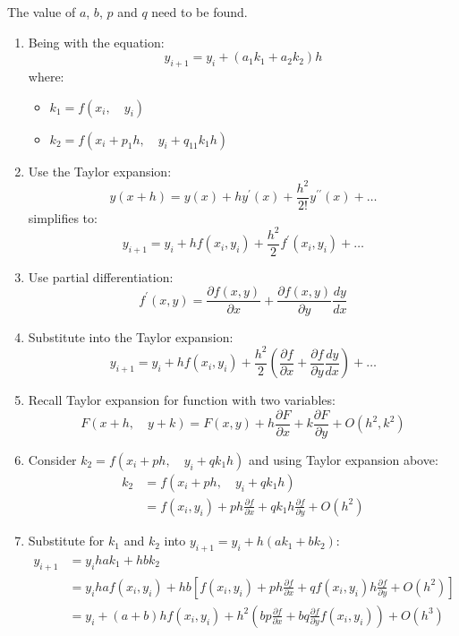 \documentclass[10pt,a4paper]{article}
\begin{document}
The value of $a$, $b$, $p$ and $q$ need to be found.
\begin{enumerate}
    \item Being with the equation: 
    $$
        y_{i+1}=y_i + (a_1k_1+a_2k_2)h
    $$
    where: 
    \begin{itemize}
        \item $k_1 = f(x_i, \quad y_i)$
        \item $k_2 = f(x_i+p_1h, \quad y_i + q_{11}k_1h)$
    \end{itemize}

    \item Use the Taylor expansion:
    $$
        y(x+h)=y(x)+hy^{\prime}(x)+\frac{h^2}{2!}y^{\prime \prime}(x)+\dots
    $$
    simplifies to:
    $$
        y_{i+1}=y_i + hf(x_i,y_i)+\frac{h^2}{2}f^{\prime}(x_i,y_i)+\dots
    $$

    \item Use partial differentiation:
    $$
        f^{\prime}(x,y) = \frac{\partial f(x,y)}{\partial x} + \frac{\partial f(x,y)}{\partial y} \frac{dy}{dx}
    $$

    \item Substitute into the Taylor expansion:
    $$
        y_{i+1}=y_i+hf(x_i,y_i)+\frac{h^2}{2}\left(\frac{\partial f}{\partial x} + \frac{\partial f}{\partial y}\frac{dy}{dx}\right) + \dots
    $$

    \item Recall Taylor expansion for function with two variables:
    $$
        F(x+h, \quad y+k) = F(x,y) + h\frac{\partial F}{\partial x} + k\frac{\partial F}{\partial y} + O(h^2,k^2)
    $$

    \item Consider $k_2 = f(x_i + ph, \quad y_i + qk_1h)$ and using Taylor expansion above:
    \begin{equation*}
        \begin{aligned}
            k_2 &= f(x_i + ph, \quad y_i+qk_1h) \\
            &= f(x_i, y_i) + ph\frac{\partial f}{\partial x} + qk_1h\frac{\partial f}{\partial y} + O(h^2)
        \end{aligned}
    \end{equation*}

    \item Substitute for $k_1$ and $k_2$ into $y_{i+1}=y_i + h(ak_1 + bk_2)$:
    \begin{equation*}
        \begin{aligned}
            y_{i+1} &= y_i hak_1 + hbk_2 \\
            &= y_i haf(x_i,y_i) + hb\left[f(x_i,y_i)+ph\frac{\partial f}{\partial x}+qf(x_i,y_i)h\frac{\partial f}{\partial y}+O(h^2)\right] \\
            &= y_i + (a+b)hf(x_i,y_i)+h^2\left(bp\frac{\partial f}{\partial x}+bq\frac{\partial f}{\partial y}f(x_i,y_i)\right) + O(h^3)
        \end{aligned}
    \end{equation*}


\end{enumerate}
\end{document}
